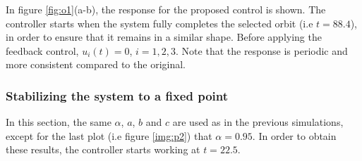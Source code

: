     In figure \ref{fig:o1}(a-b), the response for the proposed control is shown. The controller starts when the system fully completes the selected orbit (i.e $t=88.4$), in order to ensure that it remains in a similar shape. Before applying the feedback control, $u_i(t)=0$, $i=1,2,3$. Note that the response is periodic and more consistent compared to the original.

\subsubsection{Stabilizing the system to a fixed point}
In this section, the same $\alpha$, $a$, $b$ and $c$ are used as in the previous simulations, except for the last plot (i.e figure \ref{img:p2}) that $\alpha=0.95$. In order to obtain these results, the controller starts working at $t=22.5$. 
